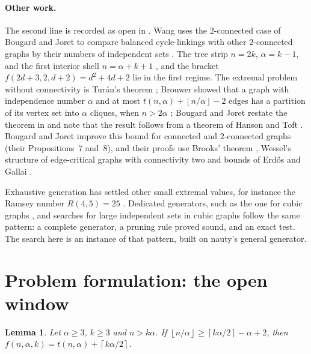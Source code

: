 \documentclass[11pt]{article}
\newtheorem{lemma}[theorem]{Lemma}
\theoremstyle{definition}
\theoremstyle{remark}
\newcommand{\ceil}[1]{\left\lceil #1\right\rceil}
\newcommand{\floor}[1]{\left\lfloor #1\right\rfloor}
\begin{document}
\paragraph{Other work.} The second line is recorded as open in \cite{LiuNing}. Wang uses the $2$-connected case of
Bougard and Joret to compare balanced cycle-linkings with other $2$-connected graphs by their numbers of independent
sets \cite{Wang}. The tree strip $n=2k$, $\alpha=k-1$, and the first interior shell $n=\alpha+k+1$ \cite{Shell}, and the bracket $f(2d+3,2,d+2)=d^2+4d+2$ \cite{Next} lie in the first regime. The extremal problem without
connectivity is Tur\'an's theorem \cite{Turan}; Brouwer showed that a graph with independence number
$\alpha$ and at most $t(n,\alpha)+\floor{n/\alpha}-2$ edges has a partition of its vertex set into $\alpha$ cliques,
when $n>2\alpha$ \cite{Brouwer}; Bougard and Joret restate the theorem in \cite[Section~5]{BJ} and note
that the result follows from a theorem of Hanson and Toft \cite{HansonToft}. Bougard and Joret improve this
bound for connected and $2$-connected graphs (their Propositions~7 and~8), and their proofs use Brooks' theorem
\cite{Brooks}, Wessel's structure of edge-critical graphs with connectivity two \cite{Wessel} and bounds of
Erd\H{o}s and Gallai \cite{ErdosGallai}.

Exhaustive generation has settled other small extremal values, for instance the Ramsey number $R(4,5)=25$
\cite{McKayRadziszowski}. Dedicated generators, such as the one for cubic graphs \cite{BGMcubic}, and searches for large
independent sets in cubic graphs \cite{CGJcubic} follow the same pattern: a complete generator, a pruning rule proved
sound, and an exact test. The search here is an instance of that pattern, built on nauty's general generator.

\section{Problem formulation: the open window}\label{sec:window}

\begin{lemma}\label{lem:window}
Let $\alpha\ge3$, $k\ge3$ and $n>k\alpha$. If $\floor{n/\alpha}\ge\ceil{k\alpha/2}-\alpha+2$, then
$f(n,\alpha,k)=t(n,\alpha)+\ceil{k\alpha/2}$.
\end{lemma}
\end{document}
